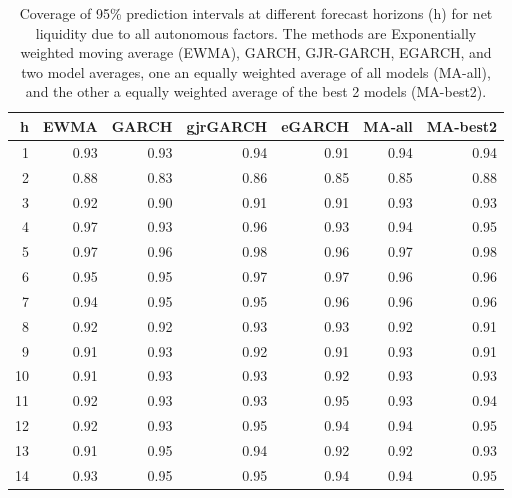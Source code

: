 \begin{table}[ht]
\centering
\begin{tabular}{rrrrrrr}
  \hline
h & EWMA & GARCH & gjrGARCH & eGARCH & MA-all & MA-best2 \\ 
  \hline
1 & 0.93 & 0.93 & 0.94 & 0.91 & 0.94 & 0.94 \\ 
  2 & 0.88 & 0.83 & 0.86 & 0.85 & 0.85 & 0.88 \\ 
  3 & 0.92 & 0.90 & 0.91 & 0.91 & 0.93 & 0.93 \\ 
  4 & 0.97 & 0.93 & 0.96 & 0.93 & 0.94 & 0.95 \\ 
  5 & 0.97 & 0.96 & 0.98 & 0.96 & 0.97 & 0.98 \\ 
  6 & 0.95 & 0.95 & 0.97 & 0.97 & 0.96 & 0.96 \\ 
  7 & 0.94 & 0.95 & 0.95 & 0.96 & 0.96 & 0.96 \\ 
  8 & 0.92 & 0.92 & 0.93 & 0.93 & 0.92 & 0.91 \\ 
  9 & 0.91 & 0.93 & 0.92 & 0.91 & 0.93 & 0.91 \\ 
  10 & 0.91 & 0.93 & 0.93 & 0.92 & 0.93 & 0.93 \\ 
  11 & 0.92 & 0.93 & 0.93 & 0.95 & 0.93 & 0.94 \\ 
  12 & 0.92 & 0.93 & 0.95 & 0.94 & 0.94 & 0.95 \\ 
  13 & 0.91 & 0.95 & 0.94 & 0.92 & 0.92 & 0.93 \\ 
  14 & 0.93 & 0.95 & 0.95 & 0.94 & 0.94 & 0.95 \\ 
   \hline
\end{tabular}
\caption{Coverage of 95\% prediction intervals at different forecast horizons (h) for net liquidity due to all autonomous factors. The methods are Exponentially weighted moving average (EWMA), GARCH, GJR-GARCH, EGARCH, and two model averages, one an equally weighted average of all models (MA-all), and the other a equally weighted average of the best 2 models (MA-best2).}
\label{tab:covagg}
\end{table}
